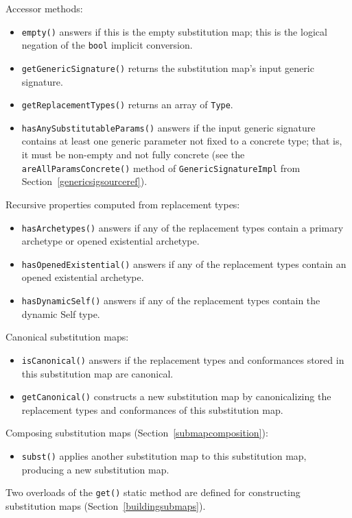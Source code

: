 \documentclass[../generics]{subfiles}
\begin{document}
Accessor methods:
\begin{itemize}
\item \texttt{empty()} answers if this is the empty substitution map; this is the logical negation of the \texttt{bool} implicit conversion.
\item \texttt{getGenericSignature()} returns the substitution map's input generic signature.
\item \texttt{getReplacementTypes()} returns an array of \texttt{Type}.
\item \texttt{hasAnySubstitutableParams()} answers if the input generic signature contains at least one generic parameter not fixed to a concrete type; that is, it must be non-empty and not fully concrete (see the \texttt{areAllParamsConcrete()} method of \texttt{GenericSignatureImpl} from Section~\ref{genericsigsourceref}).
\end{itemize}
Recursive properties computed from replacement types:
\begin{itemize}
\item \texttt{hasArchetypes()} answers if any of the replacement types contain a primary archetype or opened existential archetype.
\item \texttt{hasOpenedExistential()} answers if any of the replacement types contain an opened existential archetype.
\item \texttt{hasDynamicSelf()} answers if any of the replacement types contain the dynamic Self type.
\end{itemize}
Canonical substitution maps:
\begin{itemize}
\item \texttt{isCanonical()} answers if the replacement types and conformances stored in this substitution map are canonical.
\item \texttt{getCanonical()} constructs a new substitution map by canonicalizing the replacement types and conformances of this substitution map.
\end{itemize}
Composing substitution maps (Section~\ref{submapcomposition}):
\begin{itemize}
\item \texttt{subst()} applies another substitution map to this substitution map, producing a new substitution map.
\end{itemize}
Two overloads of the \texttt{get()} static method are defined for constructing substitution maps (Section~\ref{buildingsubmaps}).
\end{document}
